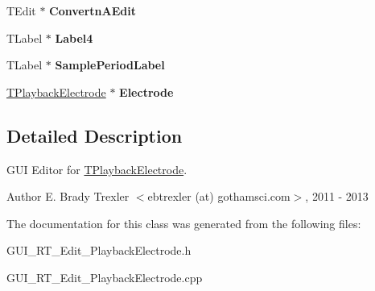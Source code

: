 \begin{DoxyCompactItemize}
\item 
\hypertarget{class_t_playback_electrode_form_a4fdf4a3d5b24cef5c31306b104c54e5b}{T\+Edit $\ast$ {\bfseries Convertn\+A\+Edit}}\label{class_t_playback_electrode_form_a4fdf4a3d5b24cef5c31306b104c54e5b}

\item 
\hypertarget{class_t_playback_electrode_form_a6430163c6fafddc11488fec3ec66adde}{T\+Label $\ast$ {\bfseries Label4}}\label{class_t_playback_electrode_form_a6430163c6fafddc11488fec3ec66adde}

\item 
\hypertarget{class_t_playback_electrode_form_a636a544c3634fe39f7e0e978fac063c5}{T\+Label $\ast$ {\bfseries Sample\+Period\+Label}}\label{class_t_playback_electrode_form_a636a544c3634fe39f7e0e978fac063c5}

\item 
\hypertarget{class_t_playback_electrode_form_aab4f1a8edd146a4e16f2bbe290b797a7}{\hyperlink{class_t_playback_electrode}{T\+Playback\+Electrode} $\ast$ {\bfseries Electrode}}\label{class_t_playback_electrode_form_aab4f1a8edd146a4e16f2bbe290b797a7}

\end{DoxyCompactItemize}


\subsection{Detailed Description}
G\+U\+I Editor for \hyperlink{class_t_playback_electrode}{T\+Playback\+Electrode}. 

\begin{DoxyAuthor}{Author}
E. Brady Trexler $<$ebtrexler (at) gothamsci.\+com$>$, 2011 -\/ 2013 
\end{DoxyAuthor}


The documentation for this class was generated from the following files\+:\begin{DoxyCompactItemize}
\item 
G\+U\+I\+\_\+\+R\+T\+\_\+\+Edit\+\_\+\+Playback\+Electrode.\+h\item 
G\+U\+I\+\_\+\+R\+T\+\_\+\+Edit\+\_\+\+Playback\+Electrode.\+cpp\end{DoxyCompactItemize}
